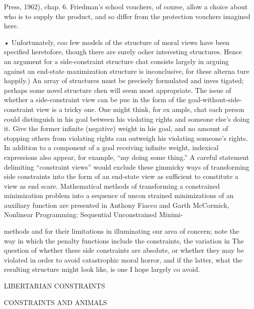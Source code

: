 \documentclass[11pt,openany]{book}
\begin{document}
{\footnotesize\setlength{\parindent}{0pt}\setlength{\parskip}{5pt}

Press, 1962), chap. 6. Friedman's school vouchers, of course, allow a choice about who is to supply the product, and so differ from the protection vouchers imagined here.\par

• Unfortunately, coo few models of the structure of moral views have been specified heretofore, though there are surely ocher interesting structures. Hence an argument for a side-constraint structure chat consists largely in arguing against an end-state maximization structure is inconclusive, for these alterna ture happily.) An array of structures must be precisely formulated and inves tigated; perhaps some novel structure chen will seem most appropriate. The issue of whether a side-constraint view can be puc in the form of the goal-without-side-constraint view is a tricky one. One might think, for ex ample, chat each person could distinguish in his goal between his violating rights and someone else's doing it. Give the former infinite (negative) weight in his goal, and no amount of stopping others from violating rights can outweigh his violating someone's rights. In addition to a component of a goal receiving infinite weight, indexical expressions also appear, for example, ``my doing some thing.'' A careful statement delimiting ``constraint views'' would exclude these gimmicky ways of transforming side constraints into the form of an end-state view as sufficient to constitute a view as end scare. Mathematical methods of transforming a constrained minimization problem into a sequence of uncon strained minimizations of an auxiliary function are presented in Anthony Fiacco and Garth McCormick, Nonlinear Programming: Sequential Unconstrained Minimi-\par

methods and for their limitations in illuminating our area of concern; note the way in which the penalty functions include the constraints, the variation in The question of whether these side constraints are absolute, or whether they may be violated in order to avoid catastrophic moral horror, and if the latter, what the resulting structure might look like, is one I hope largely co avoid.\par

LIBERTARIAN CONSTRAINTS\par

CONSTRAINTS AND ANIMALS\par

}
\end{document}
